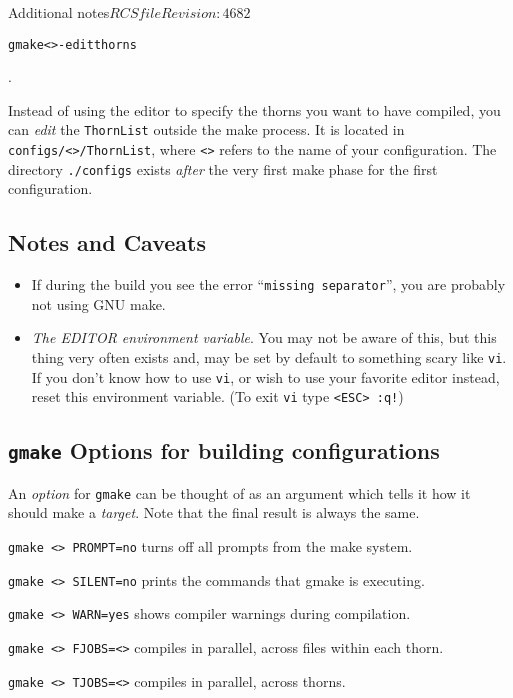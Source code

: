\begin{cactuspart}{Additional notes}{$RCSfile$}{$Revision: 4682 $}
\begin{alltt}
gmake <>-editthorns
\end{alltt}.

Instead of using the editor to specify the thorns you want to
  have compiled, you can \emph{edit} the \texttt{ThornList} outside
  the make process. It is located in \texttt{configs/<>/ThornList},
  where \texttt{<>} refers to the name of your configuration.
  The directory \texttt{./configs} exists \emph{ after} the very first
  make phase for the first configuration.

\subsection{Notes and Caveats}
\begin{itemize}
\item{} If during the build you see the error ``\texttt{missing
    separator}'', you are probably not using GNU make.
\item{} \textit{The EDITOR environment variable}. You may not be aware of
  this, but this thing very often exists and, may be set  by default to
  something scary like \texttt{vi}. If you don't know how to use \texttt{vi},
  or wish to
  use your favorite editor instead, reset this environment variable.
  (To exit \texttt{vi} type \texttt{<ESC> :q!})
\end{itemize}

\subsection{\texttt{gmake} Options for building configurations}
\label{sec:gmopfobuco}

An \textit{option} for \texttt{gmake} can be thought of as an argument which tells
it how it should make a \textit{target}. Note that the final result is always
the same.

\begin{Lentry}
\item [\texttt{gmake <\var{target}> PROMPT=no}] turns off all prompts from the
make system.
\item [\texttt{gmake <\var{target}> SILENT=no}] prints the commands that gmake
is executing.
\item [\texttt{gmake <\var{target}> WARN=yes}] shows compiler warnings during
compilation.
\item [\texttt{gmake <\var{target}> FJOBS=<\var{number}>}] compiles in parallel,
across files within each thorn.
\item [\texttt{gmake <\var{target}> TJOBS=<\var{number}>}] compiles in parallel,
across thorns.


\end{Lentry}
\end{cactuspart}

